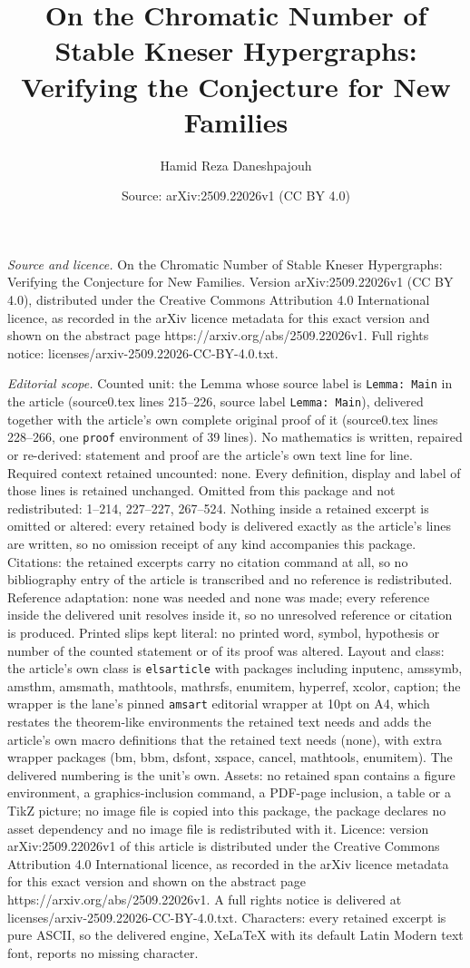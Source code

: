 \documentclass[10pt,a4paper]{amsart}
\title[On the Chromatic Number of Stable Kneser Hypergraphs: Verify]{On the Chromatic Number of Stable Kneser Hypergraphs: Verifying the Conjecture for New Families}
\author{Hamid Reza Daneshpajouh}
\date{Source: arXiv:2509.22026v1 (CC BY 4.0)}
\begin{document}
\maketitle

\noindent\emph{Source and licence.} On the Chromatic Number of Stable Kneser Hypergraphs: Verifying the Conjecture for New Families. Version arXiv:2509.22026v1 (CC BY 4.0), distributed under the Creative Commons Attribution 4.0 International licence, as recorded in the arXiv licence metadata for this exact version and shown on the abstract page https://arxiv.org/abs/2509.22026v1. Full rights notice: licenses/arxiv-2509.22026-CC-BY-4.0.txt.\par\smallskip

\noindent\textit{Editorial scope.} Counted unit: the Lemma whose source label is \texttt{Lemma: Main} in the article (source0.tex lines 215--226, source label \texttt{Lemma: Main}), delivered together with the article's own complete original proof of it (source0.tex lines 228--266, one \texttt{proof} environment of 39 lines). No mathematics is written, repaired or re-derived: statement and proof are the article's own text line for line. Required context retained uncounted: none. Every definition, display and label of those lines is retained unchanged. Omitted from this package and not redistributed: 1--214, 227--227, 267--524. Nothing inside a retained excerpt is omitted or altered: every retained body is delivered exactly as the article's lines are written, so no omission receipt of any kind accompanies this package. Citations: the retained excerpts carry no citation command at all, so no bibliography entry of the article is transcribed and no reference is redistributed. Reference adaptation: none was needed and none was made; every reference inside the delivered unit resolves inside it, so no unresolved reference or citation is produced. Printed slips kept literal: no printed word, symbol, hypothesis or number of the counted statement or of its proof was altered. Layout and class: the article's own class is \texttt{elsarticle} with packages including inputenc, amssymb, amsthm, amsmath, mathtools, mathrsfs, enumitem, hyperref, xcolor, caption; the wrapper is the lane's pinned \texttt{amsart} editorial wrapper at 10pt on A4, which restates the theorem-like environments the retained text needs and adds the article's own macro definitions that the retained text needs (none), with extra wrapper packages (bm, bbm, dsfont, xspace, cancel, mathtools, enumitem). The delivered numbering is the unit's own. Assets: no retained span contains a figure environment, a graphics-inclusion command, a PDF-page inclusion, a table or a TikZ picture; no image file is copied into this package, the package declares no asset dependency and no image file is redistributed with it. Licence: version arXiv:2509.22026v1 of this article is distributed under the Creative Commons Attribution 4.0 International licence, as recorded in the arXiv licence metadata for this exact version and shown on the abstract page https://arxiv.org/abs/2509.22026v1. A full rights notice is delivered at licenses/arxiv-2509.22026-CC-BY-4.0.txt. Characters: every retained excerpt is pure ASCII, so the delivered engine, XeLaTeX with its default Latin Modern text font, reports no missing character.
\end{document}
